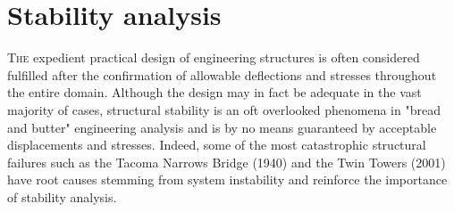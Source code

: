 



\chapter{Stability analysis}
\label{chap:chapter_2_2}

\renewcommand{\Thema}{Stability analysis}

\lettrine[lines=2]{T}{he} expedient practical design of engineering structures is often considered fulfilled after the confirmation of allowable deflections and stresses throughout the entire domain. Although the design may in fact be adequate in the vast majority of cases, structural stability is an oft overlooked phenomena in "bread and butter" engineering analysis and is by no means guaranteed by acceptable displacements and stresses. Indeed, some of the most catastrophic structural failures such as the Tacoma Narrows Bridge (1940) and the Twin Towers (2001) have root  causes stemming from system instability and reinforce the importance of stability analysis.

